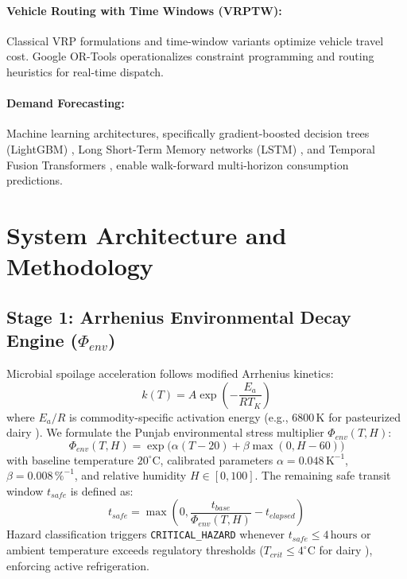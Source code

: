 \documentclass[11pt,a4paper]{article}
\begin{document}
\paragraph{Vehicle Routing with Time Windows (VRPTW):} Classical VRP formulations \cite{dantzig1959truck,toth2014vrp} and time-window variants \cite{solomon1987} optimize vehicle travel cost. Google OR-Tools \cite{orgtools2024,orgtoolsvrp2024} operationalizes constraint programming and routing heuristics for real-time dispatch.

\paragraph{Demand Forecasting:} Machine learning architectures, specifically gradient-boosted decision trees (LightGBM) \cite{ke2017lightgbm}, Long Short-Term Memory networks (LSTM) \cite{hochreiter1997lstm}, and Temporal Fusion Transformers \cite{lim2021tft}, enable walk-forward multi-horizon consumption predictions.

\section{System Architecture and Methodology}

\subsection{Stage 1: Arrhenius Environmental Decay Engine ($\Phi_{env}$)}
Microbial spoilage acceleration follows modified Arrhenius kinetics:
\begin{equation}
    k(T) = A \exp\left(-\frac{E_a}{R T_K}\right)
\end{equation}
where $E_a/R$ is commodity-specific activation energy (e.g., $6800\,\text{K}$ for pasteurized dairy \cite{kumar2010dairy}). We formulate the Punjab environmental stress multiplier $\Phi_{env}(T, H)$:
\begin{equation}
    \Phi_{env}(T, H) = \exp\Big(\alpha (T - 20) + \beta \max(0, H - 60)\Big)
\end{equation}
with baseline temperature $20^\circ\text{C}$, calibrated parameters $\alpha = 0.048\,\text{K}^{-1}$, $\beta = 0.008\,\%^{-1}$, and relative humidity $H \in [0, 100]$. The remaining safe transit window $t_{safe}$ is defined as:
\begin{equation}
    t_{safe} = \max\left(0, \frac{t_{base}}{\Phi_{env}(T, H)} - t_{elapsed}\right)
\end{equation}
Hazard classification triggers \texttt{CRITICAL\_HAZARD} whenever $t_{safe} \le 4\,\text{hours}$ or ambient temperature exceeds regulatory thresholds ($T_{crit} \le 4^\circ\text{C}$ for dairy \cite{fssai2011}), enforcing active refrigeration.
\end{document}
